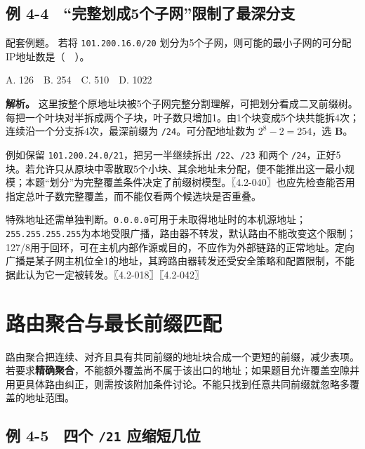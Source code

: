 \subsection{例 4-4　``完整划成5个子网''限制了最深分支}\label{CN04-ex4}

\begin{example}[配套例题]

配套例题。 若将 \texttt{101.200.16.0/\allowbreak{}20} 划分为5个子网，则可能的最小子网的可分配IP地址数是（　）。

A. 126　B. 254　C. 510　D. 1022

\end{example}

\textbf{解析。} 这里按整个原地址块被5个子网完整分割理解，可把划分看成二叉前缀树。每把一个叶块对半拆成两个子块，叶子数只增加1。由1个块变成5个块共能拆4次；连续沿一个分支拆4次，最深前缀为 \texttt{/\allowbreak{}24}。可分配地址数为 \(2^8-2=254\)，选 \textbf{B}。

例如保留 \texttt{101.200.24.0/\allowbreak{}21}，把另一半继续拆出 \texttt{/\allowbreak{}22}、\texttt{/\allowbreak{}23} 和两个 \texttt{/\allowbreak{}24}，正好5块。若允许只从原块中零散取5个小块、其余地址未分配，便不能推出这一最小规模；本题``划分''为完整覆盖条件决定了前缀树模型。〖4.2-040〗也应先检查能否用指定总叶子数完整覆盖，而不能仅看两个候选块是否重叠。

特殊地址还需单独判断。\texttt{0.0.0.0}可用于未取得地址时的本机源地址；\texttt{255.255.255.255}为本地受限广播，路由器不转发，默认路由不能改变这个限制；127/8用于回环，可在主机内部作源或目的，不应作为外部链路的正常地址。定向广播是某子网主机位全1的地址，其跨路由器转发还受安全策略和配置限制，不能据此认为它一定被转发。〖4.2-018〗〖4.2-042〗

\section{路由聚合与最长前缀匹配}\label{CN04-09}

路由聚合把连续、对齐且具有共同前缀的地址块合成一个更短的前缀，减少表项。若要求\textbf{精确聚合}，不能额外覆盖尚不属于该出口的地址；如果题目允许覆盖空隙并用更具体路由纠正，则需按该附加条件讨论。不能只找到任意共同前缀就忽略多覆盖的地址范围。

\subsection{\texorpdfstring{例 4-5　四个 \texttt{/\allowbreak{}21} 应缩短几位}{例 4-5　四个  应缩短几位}}\label{CN04-ex5}

